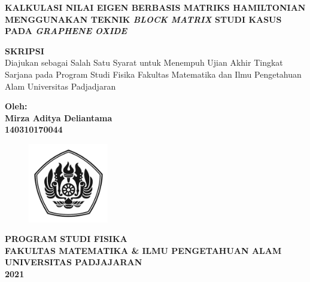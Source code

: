 \documentclass[12pt,a4paper]{report}
\begin{document}
	\begin{onehalfspacing}
\begin{titlepage}
	\centering
	{\textbf{KALKULASI NILAI EIGEN BERBASIS MATRIKS HAMILTONIAN MENGGUNAKAN TEKNIK \textit{BLOCK MATRIX} STUDI KASUS PADA \textit{GRAPHENE OXIDE}}}

	\vspace{2cm}

	\textbf{SKRIPSI} \\
	\vspace{0.5cm}
	Diajukan sebagai Salah Satu Syarat untuk Menempuh Ujian Akhir Tingkat Sarjana pada Program Studi Fisika Fakultas Matematika dan Ilmu Pengetahuan Alam Universitas Padjadjaran

	\vspace{1cm}
	\textbf{Oleh: \\
	Mirza Aditya Deliantama\\
	140310170044}

	\vspace{1cm}
	\begin{figure}[!htbp]
		\centering
		\includegraphics[width=3.5cm]{gambar/unpadbw.png}
		\label{cover}
	\end{figure}

	\vspace{3cm}
	{\textbf{PROGRAM STUDI FISIKA \\
	FAKULTAS MATEMATIKA \& ILMU PENGETAHUAN ALAM \\
	UNIVERSITAS PADJAJARAN \\
	2021 \\}}
\end{titlepage}

\setcounter{page}{2}




\end{onehalfspacing}
\end{document}
